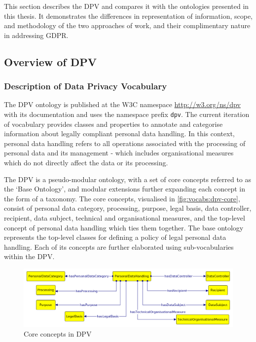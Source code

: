 This section describes the DPV and compares it with the ontologies presented in this thesis.
It demonstrates the differences in representation of information, scope, and methodology of the two approaches of work, and their complimentary nature in addressing GDPR.
\subsection{Overview of DPV}
\subsubsection{Description of Data Privacy Vocabulary}
The DPV ontology is published at the W3C namespace \url{http://w3.org/ns/dpv} with its documentation and uses the namespace prefix \texttt{dpv}. 
The current iteration of vocabulary provides classes and properties to annotate and categorise information about legally compliant personal data handling. In this context, personal data handling refers to all operations associated with the processing of personal data and its management - which includes organisational measures which do not directly affect the data or its processing.

The DPV is a pseudo-modular ontology, with a set of core concepts referred to as the `Base Ontology', and modular extensions further expanding each concept in the form of a taxonomy. 
The core concepts, visualised in \autoref{fig:vocabs:dpv-core}, consist of personal data category, processing, purpose, legal basis, data controller, recipient, data subject, technical and organisational measures, and the top-level concept of personal data handling which ties them together.
The base ontology represents the top-level classes for defining a policy of legal personal data handling. Each of its concepts are further elaborated using sub-vocabularies within the DPV.
\begin{figure}[htbp]
    \centering
    \includegraphics[width=\linewidth]{img/dpv-personaldatahandling.png}
    \caption{Core concepts in DPV \cite{}}
    \label{fig:vocabs:dpv-core}
\end{figure}

